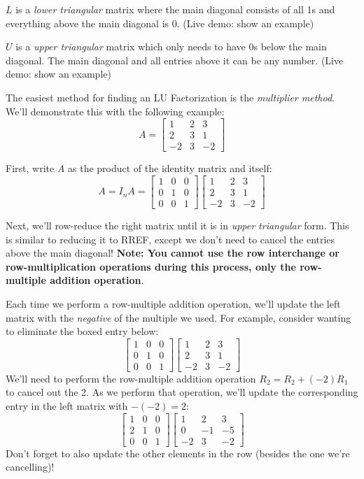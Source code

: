 \documentclass[11pt]{exam}
\begin{document}
    $L$ is a \textit{lower triangular} matrix where the main diagonal consists of all 1s and everything above the main diagonal is 0.
    (Live demo: show an example)

    $U$ is a \textit{upper triangular} matrix which only needs to have 0s below the main diagonal. The main diagonal and all entries above it can
    be any number. (Live demo: show an example)

    The easiest method for finding an LU Factorization is the \textit{multiplier method}. We'll demonstrate this with the following example:
    $$A = \begin{bmatrix} 1 & 2 & 3 \\ 2 & 3 & 1 \\ -2 & 3 & -2 \end{bmatrix}$$

    First, write $A$ as the product of the identity matrix and itself:
    $$A = I_nA = \begin{bmatrix} 1 & 0 & 0 \\ 0 & 1 & 0 \\ 0 & 0 & 1 \end{bmatrix} \begin{bmatrix} 1 & 2 & 3 \\ 2 & 3 & 1 \\ -2 & 3 & -2 \end{bmatrix}$$

    Next, we'll row-reduce the right matrix until it is in \textit{upper triangular} form. This is similar to reducing it to RREF, except we don't need
    to cancel the entries above the main diagonal! \textbf{Note: You cannot use the row interchange or row-multiplication operations during this process,
    only the row-multiple addition operation}.
    
    Each time we perform a row-multiple addition operation, we'll update the left matrix with the \textit{negative} of the multiple we used. For example,
    consider wanting to eliminate the boxed entry below:
    $$\begin{bmatrix} 1 & 0 & 0 \\ 0 & 1 & 0 \\ 0 & 0 & 1 \end{bmatrix}
      \begin{bmatrix} 1 & 2 & 3 \\ \boxed{2} & 3 & 1 \\ -2 & 3 & -2 \end{bmatrix}$$
    We'll need to perform the row-multiple addition operation $R_2 = R_2 + (-2)R_1$ to cancel out the 2. As we perform that operation, we'll update the
    corresponding entry in the left matrix with $-(-2) = 2$:
    $$\begin{bmatrix} 1 & 0 & 0 \\ \boxed{2} & 1 & 0 \\ 0 & 0 & 1 \end{bmatrix}
      \begin{bmatrix} 1 & 2 & 3 \\ 0 & -1 & -5 \\ -2 & 3 & -2 \end{bmatrix}$$
    Don't forget to also update the other elements in the row (besides the one we're cancelling)!
    
\end{document}
